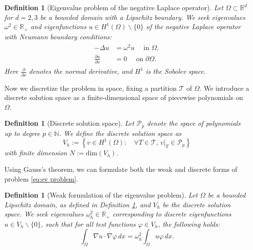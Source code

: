 \documentclass[a4paper,11pt,bibliography=totoc,listof=totoc,headinclude=true,cleardoublepage=empty,oneside]{scrbook}
\newtheorem{definition}[theorem]{Definition}
\newcommand{\R}{\mathbb{R}}
\newcommand{\N}{\mathbb{N}}
\begin{document}
\begin{definition}[Eigenvalue problem of the negative Laplace operator]\label{def:ev problem}
    Let $\Omega \subset \R^d$ for $d=2,3$ be a bounded domain with a Lipschitz boundary. We seek eigenvalues $\omega^2 \in \R_{+}$ and eigenfunctions $u\in H^1(\Omega)\backslash \{0\}$ of the negative Laplace operator with Neumann boundary conditions:
        \begin{align}\begin{split}\label{eq:ev problem}
              -\Delta u &= \omega^2 u \quad \text{ in } \Omega, \\
              \frac{\partial u}{\partial \nu} &= 0 \quad\text{ on } \partial\Omega.
        \end{split}\end{align}
    Here $\frac{\partial}{\partial\nu}$ denotes the normal derivative, and $H^1$ is the Sobolev space.
\end{definition}
Now we discretize the problem in space, fixing a partition $\mathcal{T}$ of $\Omega$. We introduce a discrete solution space as a finite-dimensional space of piecewise polynomials on $\Omega$.
\begin{definition}[Discrete solution space]\label{def:solution space}
Let $\mathcal{P}_p$ denote the space of polynomials up to degree $p \in \N$. We define the discrete solution space as
\begin{equation*}
V_h := \left\{v \in H^1(\Omega): \quad \forall T \in \mathcal{T}, \, v|_T \in \mathcal{P}_p \right\}
\end{equation*}
with finite dimension $N := \mathrm{dim} (V_h)$.
\end{definition}

Using Gauss's theorem, we can formulate both the weak and discrete forms of problem \eqref{eq:ev problem}.

\begin{definition}[Weak formulation of the eigenvalue problem]\label{def:weak form}
Let $\Omega$ be a bounded Lipschitz domain, as defined in Definition \ref{def:ev problem}, and $V_h$ be the discrete solution space. We seek eigenvalues $\omega_h^2 \in \R_+$ corresponding to discrete eigenfunctions $u \in V_h\backslash\{0\}$, such that for all test functions $\varphi \in V_h$, the following holds:
\begin{equation}\label{eq:weak form}
\int_\Omega \nabla u \cdot \nabla \varphi \, dx = \omega_h^2 \int_\Omega u \varphi \, dx.
\end{equation}
\end{definition}
\end{document}
